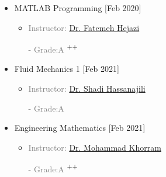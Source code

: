 \documentclass[10pt,a4paper,sans]{moderncv} %
\begin{document}
	\begin{multicols}{2}
		\begin{itemize}
			\item {} MATLAB Programming \hfill[Feb 2020]
			\begin{itemize}
				\item \textcolor{gray}{Instructor: \href{https://scholar.google.com/citations?hl=en&user=SJs5rMcAAAAJ}{Dr. Fatemeh Hejazi}}

        \begin{itemize}
               
        \textcolor{gray}{ - Grade:A  }\textsuperscript{++}
        \end{itemize}
			\end{itemize}
			
			\item {} Fluid Mechanics 1 \hfill[Feb 2021]
			\begin{itemize}
				\item \textcolor{gray}{Instructor: \href{https://scholar.google.com/citations?hl=en&user=h1wVb0IAAAAJ&view_op=list_works&sortby=pubdate}{Dr. Shadi Hassanajili
}}
			 \begin{itemize}
                \textcolor{gray}{- Grade:A}\textsuperscript{}
                 
                 \end{itemize}   
  
			\end{itemize}
			
			\item {} Engineering Mathematics \hfill[Feb 2021]
			\begin{itemize}
				\item \textcolor{gray}{Instructor: \href{https://scholar.google.com/citations?user=swfaYtQAAAAJ&hl=en}{Dr. Mohammad Khorram
}
}			
               \vspace{-0.1 em} 
               \begin{itemize}
               
                
                \textcolor{gray}{- Grade:A }\textsuperscript{++}
                

\end{itemize}
\end{itemize}
\end{itemize}
\end{multicols}
\end{document}
